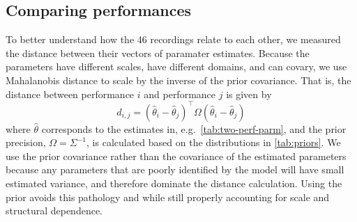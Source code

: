 \documentclass[aoas]{imsart}
\renewcommand{\hat}{\widehat}
\begin{document}
\subsection{Comparing performances}
\label{sec:clust-music-perf}

To better understand how the 46 recordings relate to each other,
we measured the distance between their vectors of paramater
estimates. Because the parameters have 
different scales, have different domains, and can covary, we
use Mahalanobis distance to scale by the inverse of the prior
covariance. That is, the distance between performance $i$ and
performance $j$ is given by
\begin{equation}
  \label{eq:parameter-distance}
d_{i,j} = \left(\hat\theta_i-\hat\theta_j\right)^\top\Omega\left(\hat\theta_i-\hat\theta_j\right)
\end{equation}
where $\hat\theta$ corresponds to the estimates in,
e.g.~\autoref{tab:two-perf-parm}, and the prior precision, $\Omega=\Sigma^{-1}$,
is calculated  based on
the distributions in \autoref{tab:priors}.
We use the prior covariance rather than the covariance
of the estimated parameters because any parameters that are poorly
identified by the model will have small estimated variance, and
therefore dominate the distance calculation. Using the prior avoids
this pathology and while still properly accounting for scale and
structural dependence.
\end{document}
